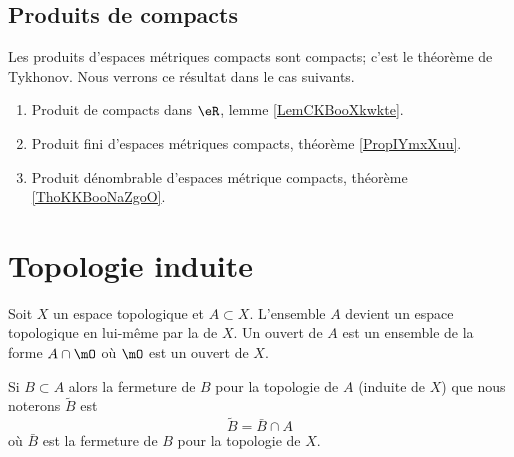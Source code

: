 \subsection{Produits de compacts}

Les produits d'espaces métriques compacts sont compacts; c'est le théorème de Tykhonov. Nous verrons ce résultat dans le cas suivants.
\begin{enumerate}
    \item
        Produit de compacts dans \( \eR\), lemme \ref{LemCKBooXkwkte}.
    \item
        Produit fini d'espaces métriques compacts, théorème \ref{PropIYmxXuu}.
    \item
        Produit dénombrable d'espaces métrique compacts, théorème \ref{ThoKKBooNaZgoO}.
\end{enumerate}

\section{Topologie induite}

\begin{definition}  \label{DefVLrgWDB}
Soit \( X\) un espace topologique et \( A\subset X\). L'ensemble \( A\) devient un espace topologique en lui-même par la  de \( X\). Un ouvert de \( A\) est un ensemble de la forme \( A\cap\mO\) où \( \mO\) est un ouvert de \( X\).
\end{definition}

\begin{lemma}       \label{LemkUYkQt}
    Si \( B\subset A\) alors la fermeture de \( B\) pour la topologie de \( A\) (induite de \( X\)) que nous noterons \( \tilde B\) est 
    \begin{equation}
        \tilde B=\bar B\cap A
    \end{equation}
    où \( \bar B\) est la fermeture de \( B\) pour la topologie de \( X\).
\end{lemma}

